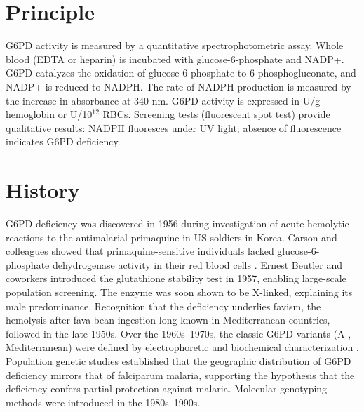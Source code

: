 \section*{Principle}
G6PD activity is measured by a quantitative spectrophotometric assay. Whole blood (EDTA or heparin) is incubated with glucose-6-phosphate and NADP+. G6PD catalyzes the oxidation of glucose-6-phosphate to 6-phosphogluconate, and NADP+ is reduced to NADPH. The rate of NADPH production is measured by the increase in absorbance at 340 nm. G6PD activity is expressed in U/g hemoglobin or U/10$^{12}$ RBCs. Screening tests (fluorescent spot test) provide qualitative results: NADPH fluoresces under UV light; absence of fluorescence indicates G6PD deficiency.
\section*{History}
G6PD deficiency was discovered in 1956 during investigation of acute hemolytic reactions to the antimalarial primaquine in US soldiers in Korea. Carson and colleagues showed that primaquine-sensitive individuals lacked glucose-6-phosphate dehydrogenase activity in their red blood cells \cite{carson1956enzymatic}. Ernest Beutler and coworkers introduced the glutathione stability test in 1957, enabling large-scale population screening. The enzyme was soon shown to be X-linked, explaining its male predominance. Recognition that the deficiency underlies favism, the hemolysis after fava bean ingestion long known in Mediterranean countries, followed in the late 1950s. Over the 1960s--1970s, the classic G6PD variants (A-, Mediterranean) were defined by electrophoretic and biochemical characterization \cite{beutler1994g6pd}. Population genetic studies established that the geographic distribution of G6PD deficiency mirrors that of falciparum malaria, supporting the hypothesis that the deficiency confers partial protection against malaria. Molecular genotyping methods were introduced in the 1980s--1990s.
